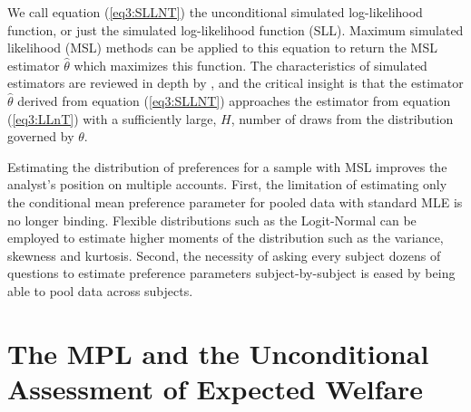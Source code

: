 \documentclass[../main.tex]{subfiles}
\begin{document}
\noindent We call equation (\ref{eq3:SLLNT}) the unconditional simulated log-likelihood function, or just the simulated log-likelihood function (SLL).
Maximum simulated likelihood (MSL) methods can be applied to this equation to return the MSL estimator $\hat{\theta}$ which maximizes this function.
The characteristics of simulated estimators are reviewed in depth by \textcite[Chapter~10]{Train2002}, and the critical insight is that the estimator $\hat{\theta}$ derived from equation (\ref{eq3:SLLNT}) approaches the estimator from equation (\ref{eq3:LLnT}) with a sufficiently large, $H$, number of draws from the distribution governed by $\theta$.

Estimating the distribution of preferences for a sample with MSL improves the analyst's position on multiple accounts.
First, the limitation of estimating only the conditional mean preference parameter for pooled data with standard MLE is no longer binding.
Flexible distributions such as the Logit-Normal{\footnotemark} can be employed to estimate higher moments of the distribution such as the variance, skewness and kurtosis.
Second, the necessity of asking every subject dozens of questions to estimate preference parameters subject-by-subject is eased by being able to pool data across subjects.

\addtocounter{footnote}{-1}

\section{The \texorpdfstring{\textcite{Holt2002}}{Holt and Laury (2002)} MPL and the Unconditional Assessment of Expected Welfare}
\end{document}
